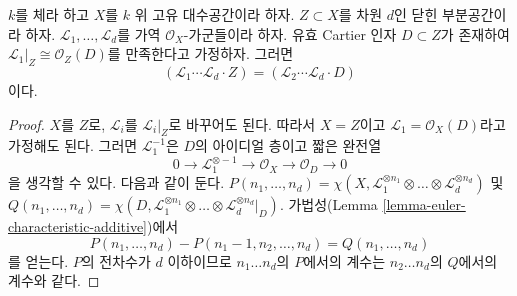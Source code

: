 \begin{lemma}
\label{lemma-numerical-intersection-effective-Cartier-divisor}
$k$를 체라 하고 $X$를 $k$ 위 고유 대수공간이라 하자.
$Z \subset X$를 차원 $d$인 닫힌 부분공간이라 하자.
$\mathcal{L}_1, \ldots, \mathcal{L}_d$를 가역 $\mathcal{O}_X$-가군들이라
하자. 유효 Cartier 인자 $D \subset Z$가 존재하여
$\mathcal{L}_1|_Z \cong \mathcal{O}_Z(D)$를 만족한다고 가정하자. 그러면
$$
(\mathcal{L}_1 \cdots \mathcal{L}_d \cdot Z) =
(\mathcal{L}_2 \cdots \mathcal{L}_d \cdot D)
$$
이다.
\end{lemma}

\begin{proof}
$X$를 $Z$로, $\mathcal{L}_i$를 $\mathcal{L}_i|_Z$로 바꾸어도 된다.
따라서 $X = Z$이고 $\mathcal{L}_1 = \mathcal{O}_X(D)$라고 가정해도 된다.
그러면 $\mathcal{L}_1^{-1}$은 $D$의 아이디얼 층이고 짧은 완전열
$$
0 \to \mathcal{L}_1^{\otimes -1} \to \mathcal{O}_X \to \mathcal{O}_D \to 0
$$
을 생각할 수 있다. 다음과 같이 둔다.
$P(n_1, \ldots, n_d) =
\chi(X, \mathcal{L}_1^{\otimes n_1} \otimes \ldots \otimes
\mathcal{L}_d^{\otimes n_d})$
및
$Q(n_1, \ldots, n_d) =
\chi(D, \mathcal{L}_1^{\otimes n_1} \otimes \ldots \otimes
\mathcal{L}_d^{\otimes n_d}|_D)$.
가법성(Lemma \ref{lemma-euler-characteristic-additive})에서
$$
P(n_1, \ldots, n_d) - P(n_1 - 1, n_2, \ldots, n_d) =
Q(n_1, \ldots, n_d)
$$
를 얻는다. $P$의 전차수가 $d$ 이하이므로 $n_1 \ldots n_d$의 $P$에서의
계수는 $n_2 \ldots n_d$의 $Q$에서의 계수와 같다.
\end{proof}














